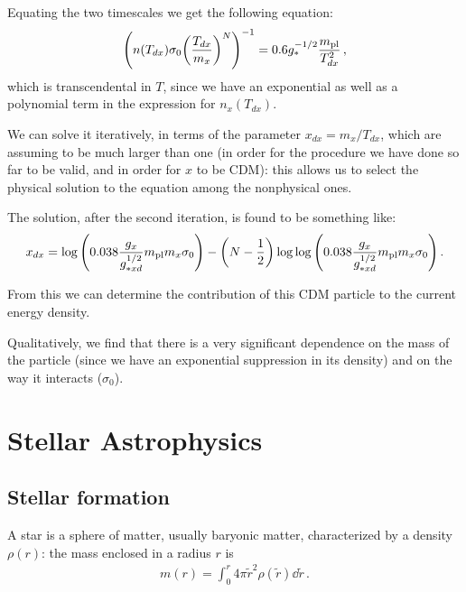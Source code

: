 \documentclass[main.tex]{subfiles}
\begin{document}
Equating the two timescales we get the following equation:
%
\begin{align}
\qty(n(T_{dx}) \sigma _0 \qty(\frac{T_{dx}}{m_x})^{N})^{-1} = \num{.6} g_{*}^{-1/2} \frac{m _{\text{pl}}}{T_{dx}^2}
\,,
\end{align}
%
which is transcendental in \(T\), since we have an exponential as well as a polynomial term in the expression for \(n_x(T_{dx})\).

We can solve it iteratively, in terms of the parameter \(x_{dx} = m_x / T_{dx}\), which are assuming to be much larger than one (in order for the procedure we have done so far to be valid, and in order for \(x\) to be CDM): this allows us to select the physical solution to the equation among the nonphysical ones. 

The solution, after the second iteration, is found to be something like: 
%
\begin{align}
  x_{dx} = \log \qty(\num{.038} \frac{g_{x}}{g_{*xd}^{1/2}} m _{\text{pl}}  m_x \sigma_0 ) - \qty(N - \frac{1}{2}) \log \log \qty(\num{.038} \frac{g_{x}}{g_{*xd}^{1/2}} m _{\text{pl}}  m_x \sigma_0 )
\,. 
\end{align}

From this we can determine the contribution of this CDM particle to the current energy density.

Qualitatively, we find that there is a very significant dependence on the mass of the particle (since we have an exponential suppression in its density) and on the way it interacts (\(\sigma_0 \)).

\chapter{Stellar Astrophysics}

\section{Stellar formation}


A star is a sphere of matter, usually baryonic matter, characterized by a density \(\rho (r)\): the mass enclosed in a radius \(r\) is 
%
\begin{align}
  m(r) = \int_{0}^{r} 4 \pi \widetilde{r}^2 \rho (\widetilde{r}) \dd{\widetilde{r}}
\,.
\end{align}
\end{document}
